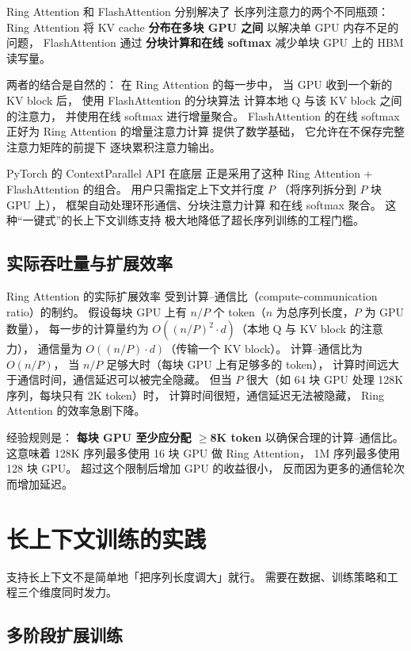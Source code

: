 Ring Attention 和 FlashAttention 分别解决了
长序列注意力的两个不同瓶颈：
Ring Attention 将 KV cache \textbf{分布在多块 GPU 之间}
以解决单 GPU 内存不足的问题，
FlashAttention 通过 \textbf{分块计算和在线 softmax}
减少单块 GPU 上的 HBM 读写量。

两者的结合是自然的：
在 Ring Attention 的每一步中，
当 GPU 收到一个新的 KV block 后，
使用 FlashAttention 的分块算法
计算本地 Q 与该 KV block 之间的注意力，
并使用在线 softmax 进行增量聚合。
FlashAttention 的在线 softmax
正好为 Ring Attention 的增量注意力计算
提供了数学基础，
它允许在不保存完整注意力矩阵的前提下
逐块累积注意力输出。

PyTorch 的 ContextParallel API 在底层
正是采用了这种 Ring Attention + FlashAttention 的组合。
用户只需指定上下文并行度 $P$
（将序列拆分到 $P$ 块 GPU 上），
框架自动处理环形通信、分块注意力计算
和在线 softmax 聚合。
这种“一键式”的长上下文训练支持
极大地降低了超长序列训练的工程门槛。

\subsection{实际吞吐量与扩展效率}

Ring Attention 的实际扩展效率
受到计算--通信比（compute-communication ratio）的制约。
假设每块 GPU 上有 $n/P$ 个 token（$n$ 为总序列长度，$P$ 为 GPU 数量），
每一步的计算量约为 $O((n/P)^2 \cdot d)$（本地 Q 与 KV block 的注意力），
通信量为 $O((n/P) \cdot d)$（传输一个 KV block）。
计算--通信比为 $O(n/P)$，
当 $n/P$ 足够大时（每块 GPU 上有足够多的 token），
计算时间远大于通信时间，通信延迟可以被完全隐藏。
但当 $P$ 很大（如 64 块 GPU 处理 128K 序列，每块只有 2K token）时，
计算时间很短，通信延迟无法被隐藏，
Ring Attention 的效率急剧下降。

经验规则是：
\textbf{每块 GPU 至少应分配 $\geq$8K token}
以确保合理的计算--通信比。
这意味着 128K 序列最多使用 16 块 GPU 做 Ring Attention，
1M 序列最多使用 128 块 GPU。
超过这个限制后增加 GPU 的收益很小，
反而因为更多的通信轮次而增加延迟。

\section{长上下文训练的实践}

支持长上下文不是简单地「把序列长度调大」就行。
需要在数据、训练策略和工程三个维度同时发力。

\subsection{多阶段扩展训练}

